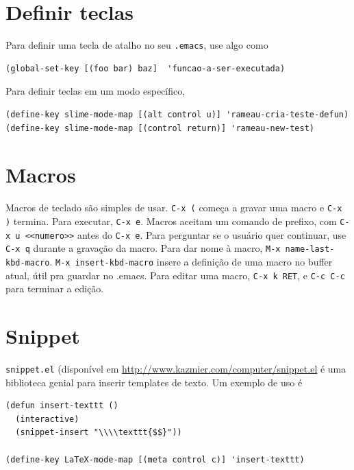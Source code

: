\documentclass[12pt,brazil]{book}
\begin{document}
\section{Definir teclas}
\label{sec:teclas}

Para definir uma tecla de atalho no seu \texttt{.emacs}, use algo como

\begin{verbatim}
(global-set-key [(foo bar) baz]  'funcao-a-ser-executada)
\end{verbatim}

Para definir teclas em um modo específico,

\begin{verbatim}
(define-key slime-mode-map [(alt control u)] 'rameau-cria-teste-defun)
(define-key slime-mode-map [(control return)] 'rameau-new-test)
\end{verbatim}

\section{Macros}
\label{sec:macros}

Macros de teclado são simples de usar. \texttt{C-x (} começa a gravar
uma macro e \texttt{C-x )} termina. Para executar, \texttt{C-x
  e}. Macros aceitam um comando de prefixo, com \texttt{C-x u
  <<numero>>} antes do \texttt{C-x e}. Para perguntar se o usuário
quer continuar, use \texttt{C-x q} durante a gravação da macro. Para
dar nome à macro, \texttt{M-x name-last-kbd-macro}. \texttt{M-x
  insert-kbd-macro} insere a definição de uma macro no buffer atual,
útil pra guardar no .emacs. Para editar uma macro, \texttt{C-x k RET},
e \texttt{C-c C-c} para terminar a edição.

\section{Snippet}
\label{sec:snippet}

\texttt{snippet.el} (disponível em
\url{http://www.kazmier.com/computer/snippet.el} é uma biblioteca
genial para inserir templates de texto. Um exemplo de uso é

\begin{verbatim}
(defun insert-texttt ()
  (interactive)
  (snippet-insert "\\\\texttt{$$}"))

(define-key LaTeX-mode-map [(meta control c)] 'insert-texttt)

\end{verbatim}
\end{document}
